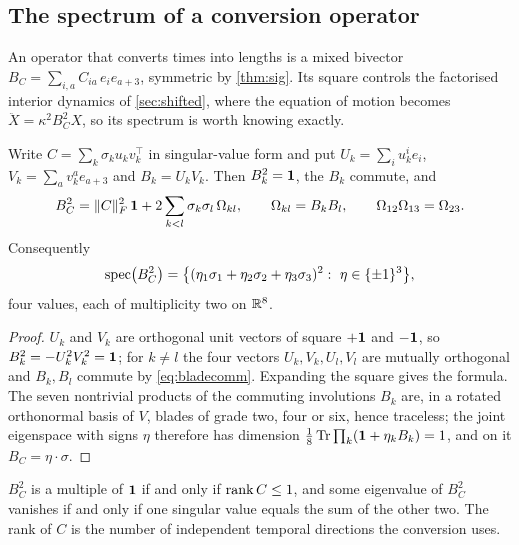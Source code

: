 \subsection{The spectrum of a conversion operator}

An operator that converts times into lengths is a mixed bivector $B_C=\sum_{i,a}C_{ia}\,e_ie_{a+3}$, symmetric by
\cref{thm:sig}. Its square controls the factorised interior dynamics of \cref{sec:shifted}, where the equation of motion becomes
$\ddot X=\kappa^2B_C^2X$, so its spectrum is worth knowing exactly.

\begin{theorem}
\label{thm:spectrumBC}
Write $C=\sum_k\sigma_ku_kv_k^{\!\top}$ in singular-value form and put $U_k=\sum_iu_k^ie_i$, $V_k=\sum_av_k^ae_{a+3}$ and
$B_k=U_kV_k$. Then $B_k^2=\mathbf 1$, the $B_k$ commute, and
\[
B_C^2=\|C\|_F^2\,\mathbf 1+2\sum_{k<l}\sigma_k\sigma_l\,\Omega_{kl},\qquad \Omega_{kl}=B_kB_l,\qquad \Omega_{12}\Omega_{13}=\Omega_{23}.
\]
Consequently
\[
\spec\bigl(B_C^2\bigr)=\bigl\{(\eta_1\sigma_1+\eta_2\sigma_2+\eta_3\sigma_3)^2:\ \eta\in\{\pm1\}^3\bigr\},
\]
four values, each of multiplicity two on $\mathbb{R}^8$.
\end{theorem}

\begin{proof}
$U_k$ and $V_k$ are orthogonal unit vectors of square $+\mathbf 1$ and $-\mathbf 1$, so $B_k^2=-U_k^2V_k^2=\mathbf 1$; for $k\neq l$ the four vectors
$U_k,V_k,U_l,V_l$ are mutually orthogonal and $B_k,B_l$ commute by \eqref{eq:bladecomm}. Expanding the square gives the formula. The
seven nontrivial products of the commuting involutions $B_k$ are, in a rotated orthonormal basis of $V$, blades of grade two, four
or six, hence traceless; the joint eigenspace with signs $\eta$ therefore has dimension $\tfrac18\operatorname{Tr}\prod_k(\mathbf 1+\eta_kB_k)=1$, and on it
$B_C=\eta\cdot\sigma$.
\end{proof}

\begin{corollary}
\label{cor:rankclock}
$B_C^2$ is a multiple of $\mathbf 1$ if and only if $\operatorname{rank} C\le1$, and some eigenvalue of $B_C^2$ vanishes if and only if one singular value
equals the sum of the other two. The rank of $C$ is the number of independent temporal directions the conversion uses.
\end{corollary}

